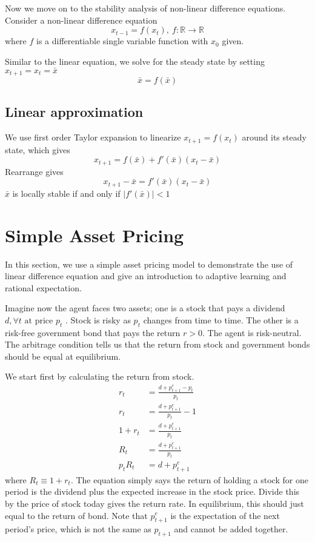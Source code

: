 \documentclass[twocolumn, fleqn]{article}
\begin{document}
		Now we move on to the stability analysis of non-linear difference equations.
		Consider a non-linear difference equation
		\begin{equation*}
			x_{t-1} = f(x_t), \ f: \mathbb{R} \rightarrow \mathbb{R}
		\end{equation*}
		where $f$ is a differentiable single variable function with $x_0$ given.

		Similar to the linear equation, we solve for the steady state by setting $x_{t+1}=x_t=\bar{x}$
		\begin{equation*}
			\bar{x} = f(\bar{x})
		\end{equation*}

		\subsection{Linear approximation}
			We use first order Taylor expansion to linearize $x_{t+1}=f(x_t)$ around its steady state, which gives
			\begin{equation*}
				x_{t+1} = f(\bar{x}) + f'(\bar{x})(x_t - \bar{x})
			\end{equation*}
			Rearrange gives
			\begin{equation*}
				x_{t+1} - \bar{x} = f'(\bar{x})(x_t - \bar{x})
			\end{equation*}
			$\bar{x}$ is locally stable if and only if $|f'(\bar{x})|<1$



	\section{Simple Asset Pricing}
		In this section, we use a simple asset pricing model to demonstrate the use of linear difference equation and
		give an introduction to adaptive learning and rational expectation.

		Imagine now the agent faces two assets; one is a stock that pays a dividend $d, \forall t \text{ at price } p_t$
		.
		Stock is risky as $p_t$ changes from time to time.
		The other is a risk-free government bond that pays the return $r>0$.
		The agent is risk-neutral.
		The arbitrage condition tells us that the return from stock and government bonds should be equal at equilibrium.

		We start first by calculating the return from stock.
		\begin{align*}
			r_t &= \frac{d+p_{t+1}^e - p_t}{p_t}\\
			r_t &= \frac{d+p_{t+1}^e}{p_t} - 1\\
			1+ r_t &= \frac{d+p_{t+1}^e}{p_t}\\[4pt]
			R_t &= \frac{d+p_{t+1}^e}{p_t}\\[4pt]
			p_t R_t &= d + p_{t+1}^e
		\end{align*}
		where $R_t \equiv 1+r_t$.
		The equation simply says the return of holding a stock for one period is the
		dividend plus the expected increase in the stock price.
		Divide this by the price of stock today gives the return rate.
		In equilibrium, this should just equal to the return of bond.
		Note that $p_{t+1}^e$ is the expectation of the next period's price, which is not the same as $p_{t+1}$ and cannot be added together.
\end{document}
